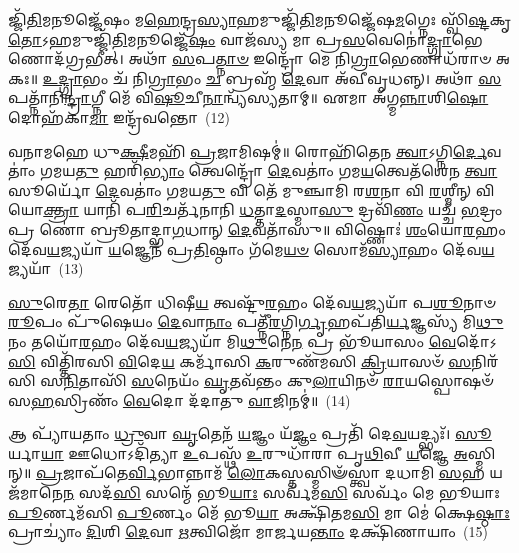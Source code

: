 𑌜𑍍𑌜𑌿᳴\-\ul{𑌤𑌿}\-𑌮𑌨𑍂𑌜𑍍𑌜𑍇᳴𑌷𑌂 𑌮\-\ul{𑌹𑍇}\-𑌨𑍍𑌦𑍍𑌰\-\ul{𑌸𑍍𑌯𑌾}\-𑌹𑌮𑍁𑌜𑍍𑌜𑌿᳴\-\ul{𑌤𑌿}\-𑌮𑌨𑍂𑌜𑍍𑌜𑍇᳴𑌷\-\ul{𑌮}\-𑌗𑍍𑌨𑍇𑌃 𑌸𑍍𑌵𑌿᳴\-\ul{𑌷𑍍𑌟}\-𑌕𑍃\-\ul{𑌤𑍋}\-\-𑌽𑌹𑌮𑍁𑌜𑍍𑌜𑌿᳴\-\ul{𑌤𑌿}\-𑌮𑌨𑍂𑌜𑍍𑌜𑍇᳴\-\ul{𑌷𑌂} 𑌵𑌾𑌜᳴𑌸𑍍𑌯 𑌮𑌾 𑌪𑍍𑌰\-\ul{𑌸}\-𑌵𑍇𑌨𑍋॑\-\ul{𑌦𑍍𑌗𑍍𑌰𑌾}\-𑌭𑍇𑌣𑍋𑌦᳴𑌗𑍍𑌰𑌭𑍀𑌤𑍍। 𑌅𑌥𑌾᳴ \ul{𑌸}\-𑌪\-\ul{𑌤𑍍𑌨𑌾}\-\-\ul{𑍞} 𑌇𑌨𑍍𑌦𑍍𑌰𑍋᳴ 𑌮𑍇 𑌨𑌿\-\ul{𑌗𑍍𑌰𑌾}\-𑌭𑍇𑌣𑌾𑌧᳴𑌰𑌾𑍞 𑌅𑌕𑌃॥ \ul{𑌉}\-\-\ul{𑌦𑍍𑌗𑍍𑌰𑌾}\-𑌭𑌂 𑌚᳴ 𑌨𑌿\-\ul{𑌗𑍍𑌰𑌾}\-𑌭𑌂 \ul{𑌚} 𑌬𑍍𑌰𑌹𑍍𑌮᳴ \ul{𑌦𑍇}\-𑌵𑌾 𑌅᳴𑌵𑍀𑌵𑍃𑌧𑌨𑍍𑌨𑍍। 𑌅𑌥𑌾᳴ \ul{𑌸}\-𑌪𑌤𑍍𑌨𑌾᳴𑌨𑌿\-\ul{𑌨𑍍𑌦𑍍𑌰𑌾}\-𑌗𑍍𑌨𑍀 𑌮𑍇᳴ 𑌵𑌿\-\ul{𑌷𑍂}\-𑌚𑍀\-\ul{𑌨𑌾}\-𑌨𑍍𑌵𑍍𑌯᳴𑌸𑍍𑌯𑌤𑌾𑌮𑍍॥ 𑌏𑌮𑌾 𑌅᳴𑌗𑍍𑌮\-\ul{𑌨𑍍𑌨𑌾}\-𑌶𑌿\-\ul{𑌷𑍋} 𑌦𑍋𑌹᳴𑌕𑌾\-\ul{𑌮𑌾} 𑌇𑌨𑍍𑌦𑍍𑌰᳴𑌵𑌨𑍍𑌤𑍋~(12)

𑌵𑌨𑌾𑌮𑌹𑍇 𑌧𑍁\-\ul{𑌕𑍍𑌷𑍀}\-𑌮𑌹𑌿᳴ \ul{𑌪𑍍𑌰}\-𑌜𑌾𑌮𑌿𑌷𑌮𑍍॑॥ 𑌰𑍋𑌹𑌿᳴𑌤𑍇𑌨 \ul{𑌤𑍍𑌵𑌾}\-\-𑌽𑌗𑍍𑌨𑌿\-\ul{𑌰𑍍𑌦𑍇}\-𑌵𑌤𑌾𑌂॑ 𑌗𑌮𑌯\-\ul{𑌤𑍁} 𑌹𑌰𑌿᳴\-\ul{𑌭𑍍𑌯𑌾𑌂} 𑌤𑍍𑌵𑍇𑌨𑍍𑌦𑍍𑌰𑍋᳴ \ul{𑌦𑍇}\-𑌵𑌤𑌾𑌂॑ 𑌗𑌮\-\ul{𑌯}\-𑌤𑍍𑌵𑍇𑌤᳴𑌶𑍇𑌨 \ul{𑌤𑍍𑌵𑌾} 𑌸𑍂𑌰𑍍𑌯𑍋᳴ \ul{𑌦𑍇}\-𑌵𑌤𑌾𑌂॑ 𑌗𑌮𑌯\-\ul{𑌤𑍁} 𑌵𑌿 𑌤𑍇᳴ 𑌮𑍁𑌞𑍍𑌚𑌾𑌮𑌿 𑌰\-\ul{𑌶}\-𑌨𑌾 𑌵𑌿 \ul{𑌰}\-𑌶𑍍𑌮𑍀𑌨𑍍 𑌵𑌿 𑌯𑍋\-\ul{𑌕𑍍𑌤𑍍𑌰𑌾} 𑌯𑌾𑌨𑌿᳴ 𑌪\-\ul{𑌰𑌿}\-𑌚𑌰𑍍𑌤᳴𑌨𑌾𑌨𑌿 \ul{𑌧}\-𑌤𑍍𑌤𑌾\-\ul{𑌦}\-𑌸𑍍𑌮𑌾\-\ul{𑌸𑍁} 𑌦𑍍𑌰𑌵𑌿᳴\-\ul{𑌣𑌂} 𑌯𑌚𑍍𑌚᳴ \ul{𑌭}\-𑌦𑍍𑌰𑌂 𑌪𑍍𑌰 𑌣𑍋॑ 𑌬𑍍𑌰𑍂𑌤𑌾𑌦𑍍𑌭𑌾\-\ul{𑌗}\-𑌧𑌾𑌨𑍍 \ul{𑌦𑍇}\-𑌵𑌤𑌾᳴𑌸𑍁॥ 𑌵𑌿𑌷𑍍𑌣𑍋𑌃॑ \ul{𑌶𑌂}\-𑌯𑍋\-\ul{𑌰}\-𑌹𑌂 𑌦𑍇᳴𑌵\-\ul{𑌯}\-𑌜𑍍𑌯𑌯𑌾᳴ \ul{𑌯}\-𑌜𑍍𑌞𑍇𑌨᳴ 𑌪𑍍𑌰\-\ul{𑌤𑌿}\-𑌷𑍍𑌠𑌾𑌂 𑌗᳴𑌮𑍇\-\ul{𑌯}\-\-\ul{𑍞} 𑌸𑍋𑌮᳴\-\ul{𑌸𑍍𑌯𑌾}\-𑌹𑌂 𑌦𑍇᳴𑌵\-\ul{𑌯}\-𑌜𑍍𑌯𑌯𑌾᳴~(13)

\-\ul{𑌸𑍁}\-𑌰𑍇\-\ul{𑌤𑌾} 𑌰𑍇𑌤𑍋᳴ 𑌧𑌿𑌷𑍀\-\ul{𑌯} 𑌤𑍍𑌵𑌷𑍍𑌟𑍁᳴\-\ul{𑌰}\-𑌹𑌂 𑌦𑍇᳴𑌵\-\ul{𑌯}\-𑌜𑍍𑌯𑌯𑌾᳴ 𑌪\-\ul{𑌶𑍂}\-𑌨𑌾𑍞 \ul{𑌰𑍂}\-𑌪𑌂 𑌪𑍁᳴𑌷𑍇𑌯𑌂 \ul{𑌦𑍇}\-𑌵𑌾\-\ul{𑌨𑌾𑌂} 𑌪𑌤𑍍𑌨𑍀᳴\-\ul{𑌰}\-𑌗𑍍𑌨𑌿\-\ul{𑌰𑍍𑌗𑍃}\-𑌹𑌪᳴𑌤𑌿\-\ul{𑌰𑍍𑌯}\-𑌜𑍍𑌞𑌸𑍍𑌯᳴ 𑌮𑌿\-\ul{𑌥𑍁}\-𑌨𑌂 𑌤𑌯𑍋᳴\-\ul{𑌰}\-𑌹𑌂 𑌦𑍇᳴𑌵\-\ul{𑌯}\-𑌜𑍍𑌯𑌯𑌾᳴ 𑌮𑌿\-\ul{𑌥𑍁}\-𑌨𑍇\-\ul{𑌨} 𑌪𑍍𑌰 𑌭𑍂᳴𑌯𑌾𑌸𑌂 \ul{𑌵𑍇}\-𑌦𑍋᳴\-𑌽\-\ul{𑌸𑌿} 𑌵𑌿𑌤𑍍𑌤𑌿᳴𑌰𑌸𑌿 \ul{𑌵𑌿}\-𑌦𑍇\-\ul{𑌯} 𑌕𑌰𑍍𑌮𑌾᳴𑌸𑌿 \ul{𑌕}\-𑌰𑍁𑌣᳴𑌮𑌸𑌿 \ul{𑌕𑍍𑌰𑌿}\-𑌯𑌾𑌸𑍞᳴ \ul{𑌸}\-𑌨𑌿𑌰᳴𑌸𑌿 𑌸\-\ul{𑌨𑌿}\-𑌤𑌾𑌸𑌿᳴ \ul{𑌸}\-𑌨𑍇𑌯𑌂᳴ \ul{𑌘𑍃}\-𑌤𑌵᳴𑌨𑍍𑌤𑌂 𑌕𑍁\-\ul{𑌲𑌾}\-𑌯𑌿𑌨𑍞᳴ \ul{𑌰𑌾}\-𑌯𑌸𑍍𑌪𑍋𑌷𑍞᳴ 𑌸\-\ul{𑌹}\-𑌸𑍍𑌰𑌿𑌣𑌂᳴ \ul{𑌵𑍇}\-𑌦𑍋 𑌦᳴𑌦𑌾𑌤𑍁 \ul{𑌵𑌾}\-𑌜𑌿𑌨𑌮𑍍॑॥~(14)

{\anuvakamend[{𑌇𑌨𑍍𑌦𑍍𑌰᳴\-\ul{𑌸𑍍𑌯𑌾}\-𑌹𑌮𑌿𑌨𑍍𑌦𑍍𑌰᳴𑌵\-\ul{𑌨𑍍𑌤𑌃} 𑌸𑍋𑌮᳴\-\ul{𑌸𑍍𑌯𑌾}\-𑌹𑌂 𑌦𑍇᳴𑌵\-\ul{𑌯}\-𑌜𑍍𑌯\-\ul{𑌯𑌾} 𑌚𑌤𑍁᳴𑌶𑍍𑌚𑌤𑍍𑌵𑌾𑌰𑌿𑍞𑌶𑌚𑍍𑌚}]}%

𑌆 𑌪𑍍𑌯𑌾᳴𑌯𑌤𑌾𑌂 \ul{𑌧𑍍𑌰𑍁}\-𑌵𑌾 \ul{𑌘𑍃}\-𑌤𑍇𑌨᳴ \ul{𑌯}\-𑌜𑍍𑌞𑌂 𑌯᳴\-\ul{𑌜𑍍𑌞𑌂} 𑌪𑍍𑌰𑌤𑌿᳴ 𑌦𑍇\-\ul{𑌵}\-𑌯𑌦𑍍𑌭𑍍𑌯𑌃᳴। \ul{𑌸𑍂}\-𑌰𑍍𑌯𑌾\-\ul{𑌯𑌾} 𑌊𑌧𑍋\-𑌽𑌦𑌿᳴𑌤𑍍𑌯𑌾 \ul{𑌉}\-𑌪𑌸𑍍𑌥᳴ \ul{𑌉}\-𑌰𑍁𑌧𑌾᳴𑌰𑌾 𑌪𑍃\-\ul{𑌥𑌿}\-𑌵𑍀 \ul{𑌯}\-𑌜𑍍𑌞𑍇 \ul{𑌅}\-𑌸𑍍𑌮𑌿𑌨𑍍॥ \ul{𑌪𑍍𑌰}\-𑌜𑌾𑌪᳴𑌤𑍇\-\ul{𑌰𑍍𑌵𑌿}\-𑌭𑌾𑌨𑍍𑌨𑌾𑌮᳴ \ul{𑌲𑍋}\-𑌕𑌸𑍍𑌤𑌸𑍍𑌮𑌿𑍟᳴𑌸𑍍𑌤𑍍𑌵𑌾 𑌦𑌧𑌾𑌮𑌿 \ul{𑌸}\-𑌹 𑌯𑌜᳴𑌮𑌾𑌨𑍇\-\ul{𑌨} 𑌸𑌦᳴\-\ul{𑌸𑌿} 𑌸𑌨𑍍𑌮𑍇᳴ 𑌭𑍂\-\ul{𑌯𑌾𑌃} 𑌸𑌰𑍍𑌵᳴𑌮\-\ul{𑌸𑌿} 𑌸𑌰𑍍𑌵𑌂᳴ 𑌮𑍇 𑌭𑍂𑌯𑌾𑌃 \ul{𑌪𑍂}\-𑌰𑍍𑌣𑌮᳴𑌸𑌿 \ul{𑌪𑍂}\-𑌰𑍍𑌣𑌂 𑌮𑍇᳴ 𑌭𑍂\-\ul{𑌯𑌾} 𑌅𑌕𑍍𑌷𑌿᳴𑌤𑌮\-\ul{𑌸𑌿} 𑌮𑌾 𑌮𑍇॑ 𑌕𑍍𑌷𑍇\-\ul{𑌷𑍍𑌠𑌾𑌃} 𑌪𑍍𑌰𑌾𑌚𑍍𑌯𑌾𑌂॑ \ul{𑌦𑌿}\-𑌶𑌿 \ul{𑌦𑍇}\-𑌵𑌾 \ul{𑌋}\-𑌤𑍍𑌵𑌿𑌜𑍋᳴ 𑌮𑌾𑌰𑍍𑌜𑌯\-\ul{𑌨𑍍𑌤𑌾𑌂} 𑌦𑌕𑍍𑌷𑌿᳴𑌣𑌾𑌯𑌾𑌂~(15)

